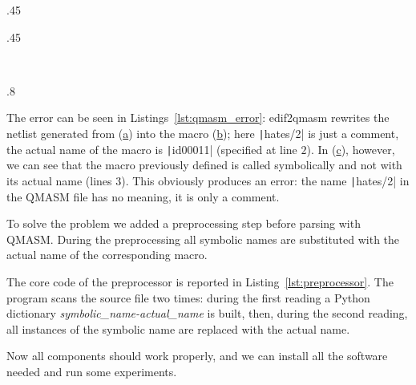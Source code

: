 {\begin{listing}[h]
	\centering
	\begin{sublisting}[c]{.45\linewidth}
		\caption{Verilog Code}
		\label{lst:error_verilog}
	\end{sublisting}
	\qquad
	\begin{sublisting}[c]{.45\linewidth}
		\caption{Macro definitions}
		\label{lst:error_def}
	\end{sublisting}
	\\\vspace{.5cm}
	\begin{sublisting}[c]{.8\linewidth}
		\caption{Macro usage}
		\label{lst:error_use}
	\end{sublisting}
	\caption{Undefined macros error}
	\label{lst:qmasm_error}
\end{listing}

The error can be seen in Listings~\ref{lst:qmasm_error}: edif2qmasm rewrites the netlist generated from (\hyperref[lst:error_verilog]{a}) into the macro (\hyperref[lst:error_def]{b}); here \texttt|hates/2| is just a comment, the actual name of the macro is \texttt|id00011| (specified at line $2$). In (\hyperref[lst:error_use]{c}), however, we can see that the macro previously defined is called symbolically and not with its actual name (lines $3$). This obviously produces an error: the name \texttt|hates/2| in the QMASM file has no meaning, it is only a comment.

\begin{listing}[h]
	\caption{Preprocessor's core}
	\label{lst:preprocessor}
\end{listing}

To solve the problem we added a preprocessing step before parsing with QMASM. During the preprocessing all symbolic names are substituted with the actual name of the corresponding macro. 

The core code of the preprocessor is reported in Listing~\ref{lst:preprocessor}. The program scans the source file two times: during the first reading a Python dictionary \emph{symbolic\_name-actual\_name} is built, then, during the second reading, all instances of the symbolic name are replaced with the actual name.

Now all components should work properly, and we can install all the software needed and run some experiments.

}
